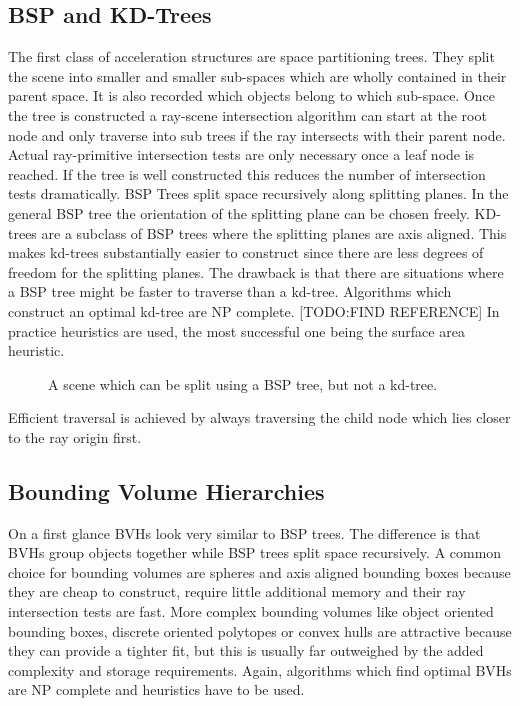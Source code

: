 \documentclass{ACGSeminar}
\begin{document}
\subsection{BSP and KD-Trees}
The first class of acceleration structures are space partitioning trees. They split the scene into smaller and smaller sub-spaces which are wholly contained in their parent space. It is also recorded which objects belong to which sub-space. Once the tree is constructed a ray-scene intersection algorithm can start at the root node and only traverse into sub trees if the ray intersects with their parent node. Actual ray-primitive intersection tests are only necessary once a leaf node is reached. If the tree is well constructed this reduces the number of intersection tests dramatically.
BSP Trees split space recursively along splitting planes. In the general BSP tree the orientation of the splitting plane can be chosen freely. KD-trees are a subclass of BSP trees where the splitting planes are axis aligned. This makes kd-trees substantially easier to construct since there are less degrees of freedom for the splitting planes. The drawback is that there are situations where a BSP tree might be faster to traverse than a kd-tree.
Algorithms which construct an optimal kd-tree are NP complete. [TODO:FIND REFERENCE] In practice heuristics are used, the most successful one being the surface area heuristic. \cite{MacDonald1990}

\begin{figure}[htb!]
  \centering
  
  \caption{A scene which can be split using a BSP tree, but not a kd-tree.}
  \label{fig:bsp-trees}
\end{figure}

Efficient traversal is achieved by always traversing the child node which lies closer to the ray origin first.

\subsection{Bounding Volume Hierarchies}
On a first glance BVHs look very similar to BSP trees. The difference is that BVHs group objects together while BSP trees split space recursively. A common choice for bounding volumes are spheres and axis aligned bounding boxes because they are cheap to construct, require little additional memory and their ray intersection tests are fast. More complex bounding volumes like object oriented bounding boxes, discrete oriented polytopes or convex hulls are attractive because they can provide a tighter fit, but this is usually far outweighed by the added complexity and storage requirements.
Again, algorithms which find optimal BVHs are NP complete and heuristics have to be used.
\end{document}
